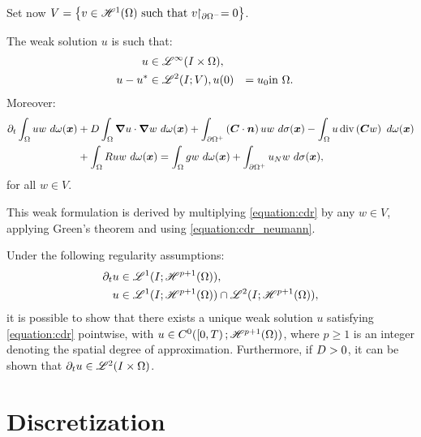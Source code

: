 Set now $V = \left\{ v \in \mathscr{H}^{1}(\Omega) \text{ such that } v \!\!\restriction_{\partial \Omega^-} = 0 \right\}$.

\begin{definition}
    The weak solution $u$ is such that: 
    \begin{align}
        u &\in \mathscr{L}^{\infty}(I \times \Omega), \\
        u - u^* &\in \mathscr{L}^{2}(I; V), 
        u(0) &= u_0 &\text{in } \Omega.
    \end{align}
    Moreover:
    \begin{align}
        \partial_t \int_{\Omega} u w ~ d \omega(\bm{x}) &+ D \int_{\Omega} \bm{\nabla} u \cdot \bm{\nabla} w ~ d \omega(\bm{x}) + \int_{\partial \Omega^+} \left( \bm{C} \cdot \bm{n} \right) u w ~ d \sigma(\bm{x}) - \int_{\Omega} u \operatorname*{div} \left( \bm{C} w \right) ~ d \omega(\bm{x}) \notag \\
        &+ \int_{\Omega} R u w ~ d \omega(\bm{x}) = \int_{\Omega} g w ~ d \omega(\bm{x}) + \int_{\partial \Omega^+} u_N w ~ d \sigma(\bm{x}),
    \end{align}
    for all $w \in V$.
\end{definition}
This weak formulation is derived by multiplying \cref{equation:cdr} by any $w \in V$, applying Green's theorem and using \cref{equation:cdr_neumann}. %

Under the following regularity assumptions:
\begin{align}
    \partial_t u & \in \mathscr{L}^{1}(I; \mathscr{H}^{p + 1}(\Omega)), \label{equation:assumption_regularity_1} \\
    u & \in \mathscr{L}^{1}(I; \mathscr{H}^{p + 1}(\Omega)) \cap \mathscr{L}^{2}(I; \mathscr{H}^{p + 1}(\Omega)), \label{equation:assumption_regularity_2}
\end{align}
it is possible to show that there exists a unique weak solution $u$ satisfying \cref{equation:cdr} pointwise, with $u \in C^0(\left[ 0, T \right); \mathscr{H}^{p + 1}(\Omega))$, where $p \geq 1$ is an integer denoting the spatial degree of approximation. Furthermore, if $D > 0$, it can be shown that $\partial_t u \in \mathscr{L}^{2}(I \times \Omega)$.

\newpage
\section{Discretization} \label{sec:cdr_discretization}

